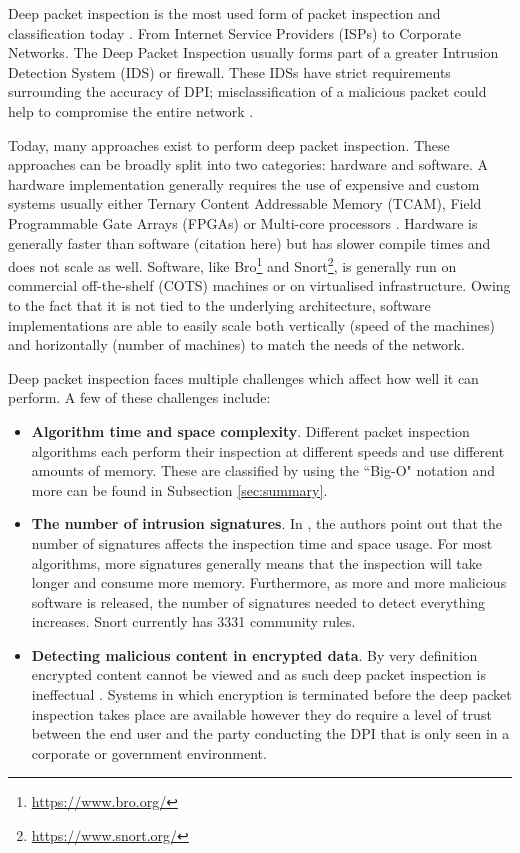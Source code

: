 \documentclass{article}
\begin{document}
Deep packet inspection is the most used form of packet inspection and classification today \citep{Cascarano2011}. From Internet Service Providers (ISPs) to Corporate Networks. The Deep Packet Inspection usually forms part of a greater Intrusion Detection System (IDS) or firewall. These IDSs have strict requirements surrounding the accuracy of DPI; misclassification of a malicious packet could help to compromise the entire network \citep{Cascarano2011}.

Today, many approaches exist to perform deep packet inspection. These approaches can be broadly split into two categories: hardware and software. A hardware implementation generally requires the use of expensive and custom systems usually either Ternary Content Addressable Memory (TCAM), Field Programmable Gate Arrays (FPGAs) or Multi-core processors \citep{AbuHmed2007}. Hardware is generally faster than software (citation here) but has slower compile times and does not scale as well. Software, like Bro\footnote{\url{https://www.bro.org/}} and Snort\footnote{\url{https://www.snort.org/}}, is generally run on commercial off-the-shelf (COTS) machines or on virtualised infrastructure. Owing to the fact that it is not tied to the underlying architecture, software implementations are able to easily scale both vertically (speed of the machines) and horizontally (number of machines) to match the needs of the network.

Deep packet inspection faces multiple challenges which affect how well it can perform. A few of these challenges include: 
\begin{itemize}
  \item \textbf{Algorithm time and space complexity}. Different packet inspection algorithms each perform their inspection at different speeds and use different amounts of memory. These are classified by using the ``Big-O" notation and more can be found in Subsection \ref{sec:summary}.
  \item \textbf{The number of intrusion signatures}. In \cite{AbuHmed2007}, the authors point out that the number of signatures affects the inspection time and space usage. For most algorithms, more signatures generally means that the inspection will take longer and consume more memory. Furthermore, as more and more malicious software is released, the number of signatures needed to detect everything increases. Snort currently has 3331 community rules. 
  \item \textbf{Detecting malicious content in encrypted data}. By very definition encrypted content cannot be viewed and as such deep packet inspection is ineffectual \citep{AbuHmed2007}. Systems in which encryption is terminated before the deep packet inspection takes place are available however they do require a level of trust between the end user and the party conducting the DPI that is only seen in a corporate or  government environment.
\end{itemize}
\end{document}
